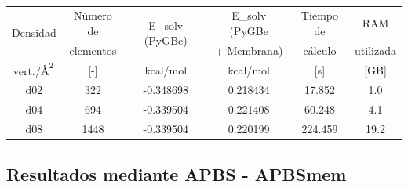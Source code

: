 \documentclass[12pt, oneside, numbers, spanish]{ezthesis}
\numberwithin{equation}{section}
\newcommand{\angstrom}{\text{\normalfont\AA}}
\begin{document}
\begin{table}[H]
	\centering
	\caption{}
	\def\arraystretch{0.8}
	\begin{tabular}{|cccccc|}\hline
		\multirow{2}{*}{Densidad} & Número de & \multirow{2}{*}{E\_solv (PyGBe)} & E\_solv (PyGBe & Tiempo de & RAM\\
		& elementos &  & + Membrana) & cálculo & utilizada\\\hline
		\rule{0pt}{15pt} vert.$/\angstrom^2$ & [-] & kcal/mol & kcal/mol & [s] & [GB] \\\hline
		d02 & 322 & -0.348698 & 0.218434 & 17.852 & 1.0\\
		d04 & 694 & -0.339504 & 0.221408 & 60.248 & 4.1\\
		d08 & 1448 & -0.339504 & 0.220199 & 224.459 & 19.2\\ \hline
	\end{tabular}\label{table:pygbe_bromoethane}
\end{table}


\subsection{Resultados mediante APBS - APBSmem}\label{subsec:resultados_apbs}
\end{document}
